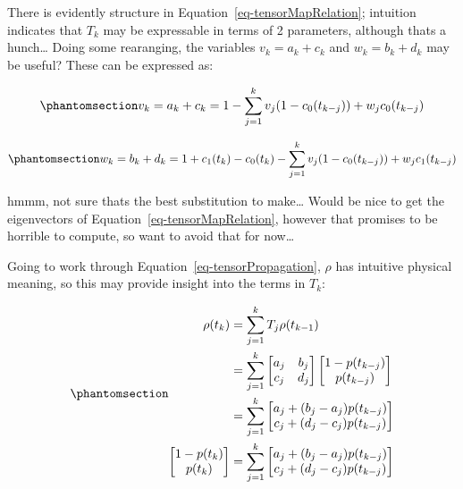 \documentclass[
  letterpaper,
  DIV=11,
  numbers=noendperiod]{scrartcl}
\begin{document}
There is evidently structure in Equation~\ref{eq-tensorMapRelation};
intuition indicates that \(T_{k}\) may be expressable in terms of 2
parameters, although thats a hunch\ldots{} Doing some rearanging, the
variables \(v_{k}=a_{k}+c_{k}\) and \(w_{k}=b_{k}+d_{k}\) may be useful?
These can be expressed as:

\begin{equation}\phantomsection\label{eq-tensorMapSubstitution1_v}{
v_{k}=a_{k}+c_{k}=1-\sum_{j=1}^{k}v_{j}(1-c_{0}(t_{k-j}))+w_{j}c_{0}(t_{k-j})
}\end{equation}

\begin{equation}\phantomsection\label{eq-tensorMapSubstitution1_w}{
w_{k}=b_{k}+d_{k}=1+c_{1}(t_{k})-c_{0}(t_{k}) - \sum_{j=1}^{k}v_{j}(1-c_{0}(t_{k-j}))+w_{j}c_{1}(t_{k-j})
}\end{equation}

hmmm, not sure thats the best substitution to make\ldots{} Would be nice
to get the eigenvectors of Equation~\ref{eq-tensorMapRelation}, however
that promises to be horrible to compute, so want to avoid that for
now\ldots{}

Going to work through Equation~\ref{eq-tensorPropagation}, \(\rho\) has
intuitive physical meaning, so this may provide insight into the terms
in \(T_{k}\):

\begin{equation}\phantomsection\label{eq-tensorPropagationSubstitution1}{
\begin{align}
\rho(t_{k})&=\sum_{j=1}^{k}T_{j}\rho(t_{k-1}) \\
&=\sum_{j=1}^{k}\begin{bmatrix}a_{j} & b_{j} \\ c_{j} & d_{j}\end{bmatrix}\begin{bmatrix}1-p(t_{k-j}) \\ p(t_{k-j})\end{bmatrix} \\
&=\sum_{j=1}^{k}\begin{bmatrix}a_{j}+(b_{j}-a_{j})p(t_{k-j}) \\ c_{j}+(d_{j}-c_{j})p(t_{k-j}) \end{bmatrix} \\
\begin{bmatrix}1-p(t_{k}) \\ p(t_{k})\end{bmatrix} &= \sum_{j=1}^{k}\begin{bmatrix}a_{j}+(b_{j}-a_{j})p(t_{k-j}) \\ c_{j}+(d_{j}-c_{j})p(t_{k-j}) \end{bmatrix}
\end{align}
}\end{equation}
\end{document}
